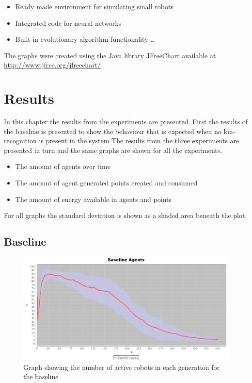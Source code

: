 \documentclass[a4paper]{book}
\begin{document}
\begin{itemize}
  \item Ready made environment for simulating small robots
  \item	Integrated code for neural networks
  \item Built-in evolutionary algorithm functionality  \ldots
\end{itemize}

The graphs were created using the Java library JFreeChart available at \url{http://www.jfree.org/jfreechart/}


\chapter{Results}
\label{cha:results}

In this chapter the results from the experiments are presented. 
First the results of the baseline is presented to show the behaviour that is expected when no kin-recognition is present in the system
The results from the three experiments are presented in turn and the same graphs are shown for all the experiments.

\begin{itemize}
\item The amount of agents over time
\item The amount of agent generated points created and consumed
\item The amount of energy available in agents and points
\end{itemize}

For all graphs the standard deviation is shown as a shaded area beneath the plot.

\section{Baseline}


\begin{figure}
	\includegraphics[width=\textwidth]{expr2/baseline_agents.png}
    \caption{Graph showing the number of active robots in each generation for the baseline}
    \label{fig:agents_baseline}
\end{figure}
\end{document}
